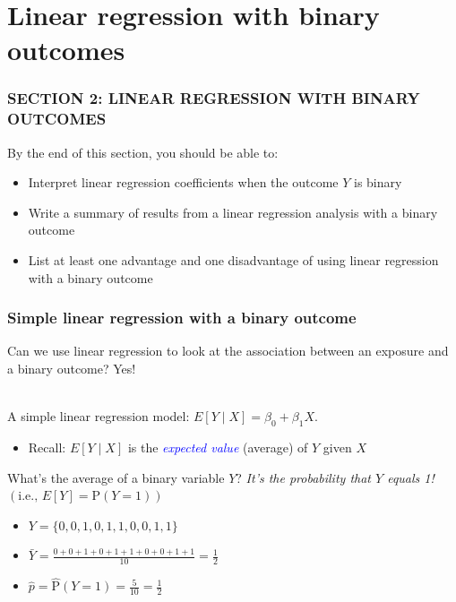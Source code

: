 \documentclass[10pt,t]{beamer}
\begin{document}
\section{Linear regression with binary outcomes}
\begin{frame}
	\frametitle{SECTION 2: LINEAR REGRESSION WITH BINARY OUTCOMES}
	
	By the end of this section, you should be able to:
	\begin{itemize}
		\item Interpret linear regression coefficients when the outcome $Y$ is binary
		\item Write a summary of results from a linear regression analysis with a binary outcome
		\item List at least one advantage and one disadvantage of using linear regression with a binary outcome
	\end{itemize}
\end{frame}
\begin{frame}
	\frametitle{Simple linear regression with a binary outcome}
	Can we use linear regression to look at the association between an exposure and a binary outcome? Yes!
	\\ ~\
	
	A simple linear regression model: $E[Y \mid X] = \beta_0 + \beta_1 X$.
	\begin{footnotesize}
		\begin{itemize}
			\item Recall: $E[Y \mid X]$ is the \textcolor{blue}{\textit{expected value}} (average) of $Y$ given $X$ 
		\end{itemize}
	\end{footnotesize}
	\pause
	What's the average of a binary variable $Y$? \pause \textit{It's the probability that $Y$ equals 1!} $\left(\text{i.e., } E[Y] = \text{P}(Y=1)\right)$ \pause
	
	\begin{itemize} \itemsep +12pt
		\item[] $Y = \{ 0, 0, 1, 0, 1, 1, 0, 0, 1, 1 \}$ \pause
		\item[] $\bar{Y} = \frac{0 + 0 + 1 + 0 + 1 + 1 + 0 + 0 + 1 + 1}{10} = \frac{1}{2}$ \pause
		\item[] $\hat{p} = \hat{\text{P}}(Y=1) = \frac{5}{10} = \frac{1}{2} $
	\end{itemize}
\end{frame}
\end{document}
